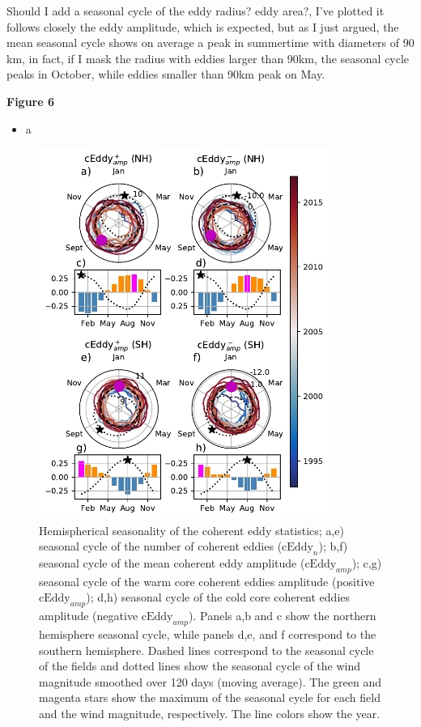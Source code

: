 \documentclass[draft,linenumbers]{agujournal2019}
\newcommand{\cEddy}{\textrm{cEddy}}
\begin{document}
	Should I add a seasonal cycle of the eddy radius? eddy area?, I've plotted it follows closely the eddy amplitude, which is expected, but as I just argued, the mean seasonal cycle shows on average a peak in summertime with diameters of 90 km, in fact, if I mask the radius with eddies larger than 90km, the seasonal cycle peaks in October, while eddies smaller than 90km peak on May. 
	

	\textbf{Figure 6}
	\begin{itemize}
		\item a
	\end{itemize}

	\begin{figure}
	    \centering
	    \includegraphics[width=95mm]{figures/All_polar_plots_eddy_stats_polarity_V4.pdf}
	    \caption{Hemispherical seasonality of the coherent eddy statistics;
		a,e) seasonal cycle of the number of coherent eddies ($\cEddy_n$); b,f) seasonal cycle of the mean coherent eddy amplitude ($\cEddy_{amp}$); c,g) seasonal cycle of the warm core coherent eddies amplitude (positive $\cEddy_{amp}$); d,h) seasonal cycle of the cold core coherent eddies amplitude (negative $\cEddy_{amp}$). Panels a,b and c show the northern hemisphere seasonal cycle, while panels d,e, and f correspond to the southern hemisphere. Dashed lines correspond to the seasonal cycle of the fields and dotted lines show the seasonal cycle of the wind magnitude smoothed over 120 days (moving average). The green and magenta stars show the maximum of the seasonal cycle for each field and the wind magnitude, respectively. The line colors show the year.}
	    \label{fig:eddy_stats_polar}
	\end{figure}
\end{document}
